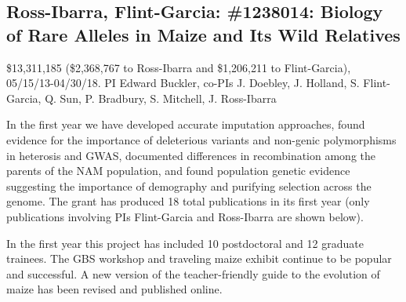 \subsection*{Ross-Ibarra, Flint-Garcia: \#1238014: Biology of Rare Alleles in Maize and Its Wild Relatives}
\$13,311,185 (\$2,368,767 to Ross-Ibarra and \$1,206,211 to Flint-Garcia), 05/15/13-04/30/18. PI Edward Buckler, co-PIs J. Doebley, J. Holland, S. Flint-Garcia, Q. Sun, P. Bradbury, S. Mitchell, J. Ross-Ibarra
\par{} In the first year we have developed accurate imputation approaches, found evidence for the importance of deleterious variants and non-genic polymorphisms in heterosis and GWAS, documented differences in recombination among the parents of the NAM population, and found population genetic evidence suggesting the importance of demography and purifying selection across the genome.  The grant has produced 18 total publications in its first year (only publications involving PIs Flint-Garcia and Ross-Ibarra are shown below). 
\par{}  In the first year this project has included 10 postdoctoral and 12 graduate trainees. The GBS workshop and traveling maize exhibit continue to be popular and successful. A new version of the teacher-friendly guide to the evolution of maize has been revised and published online. 
\par{} \citet{peiffer2013genetic, Romay2013, wills2013many, Mezmouk2014, Peiffer2014, sood2014mining}

